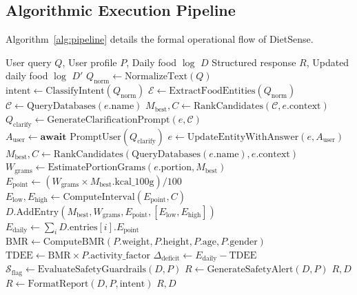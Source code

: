 \documentclass[conference]{IEEEtran}
\begin{document}
\subsection{Algorithmic Execution Pipeline}
Algorithm~\ref{alg:pipeline} details the formal operational flow of DietSense.

\begin{algorithm}[t]
\caption{DietSense Domain Agent Execution Pipeline}
\label{alg:pipeline}
\begin{algorithmic}[1]
\REQUIRE User query $Q$, User profile $P$, Daily food $\log$ $D$
\ENSURE Structured response $R$, Updated daily food $\log$ $D'$
\STATE $Q_{\text{norm}} \leftarrow \text{NormalizeText}(Q)$
\STATE $\text{intent} \leftarrow \text{ClassifyIntent}(Q_{\text{norm}})$
    \STATE $\mathcal{E} \leftarrow \text{ExtractFoodEntities}(Q_{\text{norm}})$ 
        \STATE $\mathcal{C} \leftarrow \text{QueryDatabases}(e.\text{name})$ 
        \STATE $M_{\text{best}}, C \leftarrow \text{RankCandidates}(\mathcal{C}, e.\text{context})$
            \STATE $Q_{\text{clarify}} \leftarrow \text{GenerateClarificationPrompt}(e, \mathcal{C})$
            \STATE $A_{\text{user}} \leftarrow \textbf{await } \text{PromptUser}(Q_{\text{clarify}})$
            \STATE $e \leftarrow \text{UpdateEntityWithAnswer}(e, A_{\text{user}})$
            \STATE $M_{\text{best}}, C \leftarrow \text{RankCandidates}(\text{QueryDatabases}(e.\text{name}), e.\text{context})$
        \ENDIF
        \STATE $W_{\text{grams}} \leftarrow \text{EstimatePortionGrams}(e.\text{portion}, M_{\text{best}})$
        \STATE $E_{\text{point}} \leftarrow (W_{\text{grams}} \times M_{\text{best}}.\text{kcal\_100g}) / 100$
        \STATE $E_{\text{low}}, E_{\text{high}} \leftarrow \text{ComputeInterval}(E_{\text{point}}, C)$
        \STATE $D.\text{AddEntry}(M_{\text{best}}, W_{\text{grams}}, E_{\text{point}}, [E_{\text{low}}, E_{\text{high}}])$
    \ENDFOR
{}
    \STATE $E_{\text{daily}} \leftarrow \sum_{i} D.\text{entries}[i].E_{\text{point}}$
    \STATE $\text{BMR} \leftarrow \text{ComputeBMR}(P.\text{weight}, P.\text{height}, P.\text{age}, P.\text{gender})$
    \STATE $\text{TDEE} \leftarrow \text{BMR} \times P.\text{activity\_factor}$
    \STATE $\Delta_{\text{deficit}} \leftarrow E_{\text{daily}} - \text{TDEE}$
\ENDIF
\STATE $\mathcal{S}_{\text{flag}} \leftarrow \text{EvaluateSafetyGuardrails}(D, P)$
    \STATE $R \leftarrow \text{GenerateSafetyAlert}(D, P)$ 
    \RETURN $R, D$
\ENDIF
\STATE $R \leftarrow \text{FormatReport}(D, P, \text{intent})$
\RETURN $R, D$
\end{algorithmic}
\end{algorithm}
\end{document}
